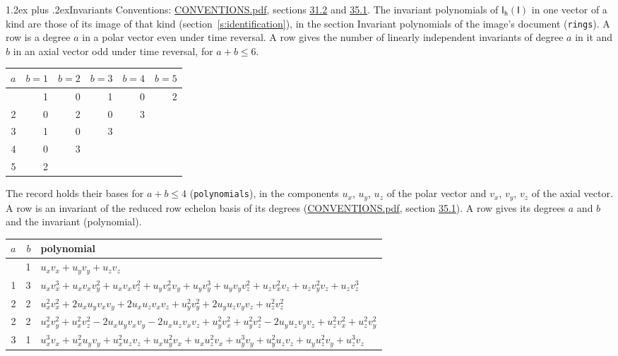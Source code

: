 \documentclass[10pt,a4paper]{article}
\makeatletter
\renewcommand\section{\@startsection{section}{1}{\z@}{-3ex plus -1ex minus -.2ex}%
  {1.2ex plus .2ex}{\normalfont\large\sffamily\bfseries\color{parttitle}}}
\numberwithin{equation}{section}
\newcommand{\grp}[1]{\mathsf{#1}}
\makeatother
\begin{document}
\section{Invariants}\label{s:invariants}
Conventions: \href{../../CONVENTIONS.pdf}{CONVENTIONS.pdf}, sections \href{../../CONVENTIONS.pdf\#conv.31.2}{31.2} and \href{../../CONVENTIONS.pdf\#conv.35.1}{35.1}.
The invariant polynomials of $\grp{I_{h}}(\grp{I})$ in one vector of a kind are those of its image of that kind (section~\ref{s:identification}), in the section Invariant polynomials of the image's document (\texttt{rings}).
\leavevmode\label{n:index.degree.polar}\label{n:index.degree.axial}A row is a degree $a$ in a polar vector even under time reversal. A row gives the number of linearly independent invariants of degree $a$ in it and $b$ in an axial vector odd under time reversal, for $a + b \le 6$.
{\small\begin{longtable}{@{}rrrrrr@{}}\toprule
$a$ & $b = 1$ & $b = 2$ & $b = 3$ & $b = 4$ & $b = 5$\\\midrule\endhead
\bottomrule\endfoot\endlastfoot
1 & 1 & 0 & 1 & 0 & 2\\*
2 & 0 & 2 & 0 & 3 & \\*
3 & 1 & 0 & 3 &  & \\*
4 & 0 & 3 &  &  & \\*
5 & 2 &  &  &  & \\
\bottomrule\end{longtable}}
\leavevmode\label{n:local.component.polar}\label{n:local.component.axial}The record holds their bases for $a + b \le 4$ (\texttt{polynomials}), in the components $u_{x}$, $u_{y}$, $u_{z}$ of the polar vector and $v_{x}$, $v_{y}$, $v_{z}$ of the axial vector. \label{n:head.polynomial}A row is an invariant of the reduced row echelon basis of its degrees (\href{../../CONVENTIONS.pdf}{CONVENTIONS.pdf}, section \href{../../CONVENTIONS.pdf\#conv.35.1}{35.1}). A row gives its degrees $a$ and $b$ and the invariant (polynomial).
{\small\renewcommand{\arraystretch}{1.2}\begin{longtable}{@{}rrl@{}}\toprule
$a$ & $b$ & polynomial\\\midrule\endhead
\bottomrule\endfoot\endlastfoot
1 & 1 & $u_{x}v_{x} + u_{y}v_{y} + u_{z}v_{z}$\\*
1 & 3 & $u_{x}v_{x}^{3} + u_{x}v_{x}v_{y}^{2} + u_{x}v_{x}v_{z}^{2} + u_{y}v_{x}^{2}v_{y} + u_{y}v_{y}^{3} + u_{y}v_{y}v_{z}^{2} + u_{z}v_{x}^{2}v_{z} + u_{z}v_{y}^{2}v_{z} + u_{z}v_{z}^{3}$\\*
2 & 2 & $u_{x}^{2}v_{x}^{2} + 2u_{x}u_{y}v_{x}v_{y} + 2u_{x}u_{z}v_{x}v_{z} + u_{y}^{2}v_{y}^{2} + 2u_{y}u_{z}v_{y}v_{z} + u_{z}^{2}v_{z}^{2}$\\*
2 & 2 & $u_{x}^{2}v_{y}^{2} + u_{x}^{2}v_{z}^{2} - 2u_{x}u_{y}v_{x}v_{y} - 2u_{x}u_{z}v_{x}v_{z} + u_{y}^{2}v_{x}^{2} + u_{y}^{2}v_{z}^{2} - 2u_{y}u_{z}v_{y}v_{z} + u_{z}^{2}v_{x}^{2} + u_{z}^{2}v_{y}^{2}$\\*
3 & 1 & $u_{x}^{3}v_{x} + u_{x}^{2}u_{y}v_{y} + u_{x}^{2}u_{z}v_{z} + u_{x}u_{y}^{2}v_{x} + u_{x}u_{z}^{2}v_{x} + u_{y}^{3}v_{y} + u_{y}^{2}u_{z}v_{z} + u_{y}u_{z}^{2}v_{y} + u_{z}^{3}v_{z}$\\
\bottomrule\end{longtable}}
\end{document}

